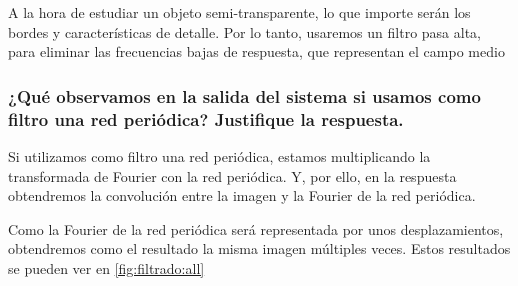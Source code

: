 \documentclass{./packages/optica-article}
\begin{document}
A la hora de estudiar un objeto semi-transparente, lo que importe serán los bordes y características de detalle. Por lo tanto, usaremos un filtro pasa alta, para eliminar las frecuencias bajas de respuesta, que representan el campo medio


\subsubsection{¿Qué observamos en la salida del sistema si usamos como filtro una red periódica? Justifique la respuesta.}
Si utilizamos como filtro una red periódica, estamos multiplicando la transformada de Fourier con la red periódica. Y, por ello, en la respuesta obtendremos la convolución entre la imagen y la Fourier de la red periódica.

Como la Fourier de la red periódica será representada por unos desplazamientos, obtendremos como el resultado la misma imagen múltiples veces. Estos resultados se pueden ver en \ref{fig:filtrado:all}
\end{document}
